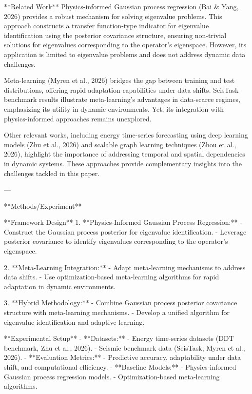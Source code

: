 **Related Work**  
Physics-informed Gaussian process regression (Bai & Yang, 2026) provides a robust mechanism for solving eigenvalue problems. This approach constructs a transfer function-type indicator for eigenvalue identification using the posterior covariance structure, ensuring non-trivial solutions for eigenvalues corresponding to the operator's eigenspace. However, its application is limited to eigenvalue problems and does not address dynamic data challenges.

Meta-learning (Myren et al., 2026) bridges the gap between training and test distributions, offering rapid adaptation capabilities under data shifts. SeisTask benchmark results illustrate meta-learning's advantages in data-scarce regimes, emphasizing its utility in dynamic environments. Yet, its integration with physics-informed approaches remains unexplored.

Other relevant works, including energy time-series forecasting using deep learning models (Zhu et al., 2026) and scalable graph learning techniques (Zhou et al., 2026), highlight the importance of addressing temporal and spatial dependencies in dynamic systems. These approaches provide complementary insights into the challenges tackled in this paper.

---

**Methods/Experiment**  

**Framework Design**  
1. **Physics-Informed Gaussian Process Regression:**  
   - Construct the Gaussian process posterior for eigenvalue identification.
   - Leverage posterior covariance to identify eigenvalues corresponding to the operator's eigenspace.

2. **Meta-Learning Integration:**  
   - Adapt meta-learning mechanisms to address data shifts.
   - Use optimization-based meta-learning algorithms for rapid adaptation in dynamic environments.

3. **Hybrid Methodology:**  
   - Combine Gaussian process posterior covariance structure with meta-learning mechanisms.
   - Develop a unified algorithm for eigenvalue identification and adaptive learning.

**Experimental Setup**  
- **Datasets:**  
  - Energy time-series datasets (DDT benchmark, Zhu et al., 2026).  
  - Seismic benchmark data (SeisTask, Myren et al., 2026).  
- **Evaluation Metrics:**  
  - Predictive accuracy, adaptability under data shift, and computational efficiency.  
- **Baseline Models:**  
  - Physics-informed Gaussian process regression models.  
  - Optimization-based meta-learning algorithms.  

